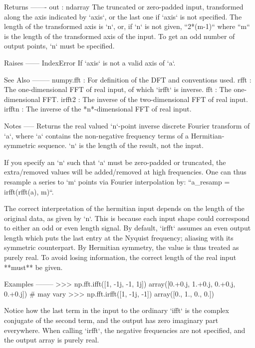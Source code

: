 \begin{DoxyVerb}
Returns
-------
out : ndarray
    The truncated or zero-padded input, transformed along the axis
    indicated by `axis`, or the last one if `axis` is not specified.
    The length of the transformed axis is `n`, or, if `n` is not given,
    ``2*(m-1)`` where ``m`` is the length of the transformed axis of the
    input. To get an odd number of output points, `n` must be specified.

Raises
------
IndexError
    If `axis` is not a valid axis of `a`.

See Also
--------
numpy.fft : For definition of the DFT and conventions used.
rfft : The one-dimensional FFT of real input, of which `irfft` is inverse.
fft : The one-dimensional FFT.
irfft2 : The inverse of the two-dimensional FFT of real input.
irfftn : The inverse of the *n*-dimensional FFT of real input.

Notes
-----
Returns the real valued `n`-point inverse discrete Fourier transform
of `a`, where `a` contains the non-negative frequency terms of a
Hermitian-symmetric sequence. `n` is the length of the result, not the
input.

If you specify an `n` such that `a` must be zero-padded or truncated, the
extra/removed values will be added/removed at high frequencies. One can
thus resample a series to `m` points via Fourier interpolation by:
``a_resamp = irfft(rfft(a), m)``.

The correct interpretation of the hermitian input depends on the length of
the original data, as given by `n`. This is because each input shape could
correspond to either an odd or even length signal. By default, `irfft`
assumes an even output length which puts the last entry at the Nyquist
frequency; aliasing with its symmetric counterpart. By Hermitian symmetry,
the value is thus treated as purely real. To avoid losing information, the
correct length of the real input **must** be given.

Examples
--------
>>> np.fft.ifft([1, -1j, -1, 1j])
array([0.+0.j,  1.+0.j,  0.+0.j,  0.+0.j]) # may vary
>>> np.fft.irfft([1, -1j, -1])
array([0.,  1.,  0.,  0.])

Notice how the last term in the input to the ordinary `ifft` is the
complex conjugate of the second term, and the output has zero imaginary
part everywhere.  When calling `irfft`, the negative frequencies are not
specified, and the output array is purely real.\end{DoxyVerb}
 \mbox{\label{namespacenumpy_1_1fft_1_1__pocketfft_aedab7d4f19bc30b2168d69a87f81925a}} 
